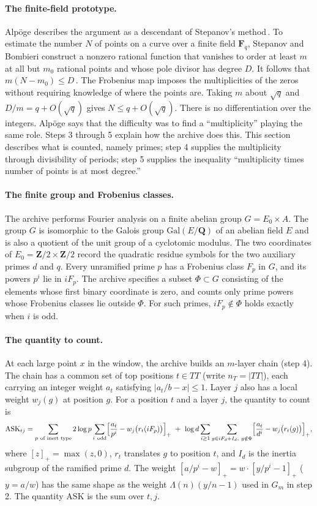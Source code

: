 \documentclass[11pt]{article}
\newcommand{\Q}{\mathbf{Q}}
\newcommand{\Z}{\mathbf{Z}}
\begin{document}
\paragraph{The finite-field prototype.} Alpöge describes the argument as a descendant of Stepanov's method\,\cite{alpoge}. To estimate the number $N$ of points on a curve over a finite field $\mathbf F_q$, Stepanov and Bombieri construct a nonzero rational function that vanishes to order at least $m$ at all but $m_0$ rational points and whose pole divisor has degree $D$. It follows that $m(N-m_0)\le D$\,\cite{stepanov,bombieri}. The Frobenius map imposes the multiplicities of the zeros without requiring knowledge of where the points are. Taking $m$ about $\sqrt q$ and $D/m=q+O(\sqrt q)$ gives $N\le q+O(\sqrt q)$. There is no differentiation over the integers. Alpöge says that the difficulty was to find a ``multiplicity'' playing the same role. Steps 3 through 5 explain how the archive does this. This section describes what is counted, namely primes; step 4 supplies the multiplicity through divisibility of periods; step 5 supplies the inequality ``multiplicity times number of points is at most degree.''

\paragraph{The finite group and Frobenius classes.} The archive performs Fourier analysis on a finite abelian group $G=E_0\times A$. The group $G$ is isomorphic to the Galois group $\mathrm{Gal}(E/\Q)$ of an abelian field $E$ and is also a quotient of the unit group of a cyclotomic modulus. The two coordinates of $E_0=\Z/2\times\Z/2$ record the quadratic residue symbols for the two auxiliary primes $d$ and $q$. Every unramified prime $p$ has a Frobenius class $F_p$ in $G$, and its powers $p^i$ lie in $iF_p$. The archive specifies a subset $\Phi\subset G$ consisting of the elements whose first binary coordinate is zero, and counts only prime powers whose Frobenius classes lie outside $\Phi$. For such primes, $iF_p\notin\Phi$ holds exactly when $i$ is odd.

\paragraph{The quantity to count.} At each large point $x$ in the window, the archive builds an $m$-layer chain (step 4). The chain has a common set of top positions $t\in TT$ (write $n_T=|TT|$), each carrying an integer weight $a_t$ satisfying $|a_t/b-x|\le1$. Layer $j$ also has a local weight $w_j(g)$ at position $g$. For a position $t$ and a layer $j$, the quantity to count is
\[
\mathrm{ASK}_{tj}=\sum_{p\ \text{of inert type}}2\log p\sum_{i\ \text{odd}}\Bigl[\frac{a_t}{p^i}-w_j\bigl(r_t(iF_p)\bigr)\Bigr]_+\ +\ \log d\sum_{i\ge1}\sum_{g\in iF_d+I_d,\ g\notin\Phi}\Bigl[\frac{a_t}{d^i}-w_j\bigl(r_t(g)\bigr)\Bigr]_+ ,
\]
where $[z]_+=\max(z,0)$, $r_t$ translates $g$ to position $t$, and $I_d$ is the inertia subgroup of the ramified prime $d$. The weight $[a/p^i-w]_+=w\cdot[y/p^i-1]_+$ ($y=a/w$) has the same shape as the weight $\Lambda(n)(y/n-1)$ used in $G_m$ in step 2. The quantity $\mathrm{ASK}$ is the sum over $t,j$.
\end{document}
